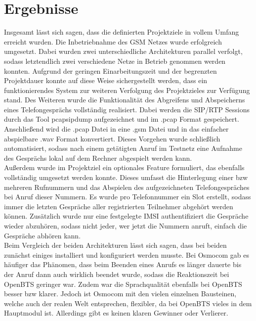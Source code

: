 \section{Ergebnisse} 
Insgesamt lässt sich sagen, dass die definierten Projektziele in vollem Umfang erreicht wurden. Die Inbetriebnahme des GSM Netzes wurde erfolgreich umgesetzt. Dabei wurden zwei unterschiedliche Architekturen parallel verfolgt, sodass letztendlich zwei verschiedene Netze in Betrieb genommen werden konnten. Aufgrund der geringen Einarbeitungszeit und der begrenzten Projektdauer konnte auf diese Weise sichergestellt werden, dass ein funktionierendes System zur weiteren Verfolgung des Projektzieles zur Verfügung stand. Des Weiteren wurde die Funktionalität des Abgreifens und Abspeicherns eines Telefongesprächs vollständig realisiert. Dabei werden die SIP/RTP Sessions durch das Tool pcapsipdump aufgezeichnet und im .pcap Format gespeichert. Anschließend wird die .pcap Datei in eine .gsm Datei und in das einfacher abspielbare .wav Format konvertiert. Dieses Vorgehen wurde schließlich automatisiert, sodass nach einem getätigten Anruf im Testnetz eine Aufnahme des Gesprächs lokal auf dem Rechner abgespielt werden kann.\\

Außerdem wurde im Projektziel ein optionales Feature formuliert, das ebenfalls vollständig umgesetzt werden konnte. Dieses umfasst die Hinterlegung einer bzw mehreren Rufnummern und das Abspielen des aufgezeichneten Telefongespräches bei Anruf dieser Nummern. Es wurde pro Telefonnummer ein Slot erstellt, sodass immer die letzten Gespräche aller registrierten Teilnehmer abgehört werden können. Zusätzlich wurde nur eine festgelegte IMSI authentifiziert die Gespräche wieder abzuhören, sodass nicht jeder, wer jetzt die Nummern anruft, einfach die Gespräche abhören kann.\\

Beim Vergleich der beiden Architekturen lässt sich sagen, dass bei beiden zunächst einiges installiert und konfiguriert werden musste. Bei Osmocom gab es häufiger das Phänomen, dass beim Beenden eines Anrufs es länger dauerte bis der Anruf dann auch wirklich beendet wurde, sodass die Reaktionszeit bei OpenBTS geringer war. Zudem war die Sprachqualität ebenfalls bei OpenBTS besser bzw klarer. Jedoch ist Osmocom mit den vielen einzelnen Bausteinen, welche auch der realen Welt entsprechen, flexibler, da bei OpenBTS vieles in dem Hauptmodul ist.
Allerdings gibt es keinen klaren Gewinner oder Verlierer.

